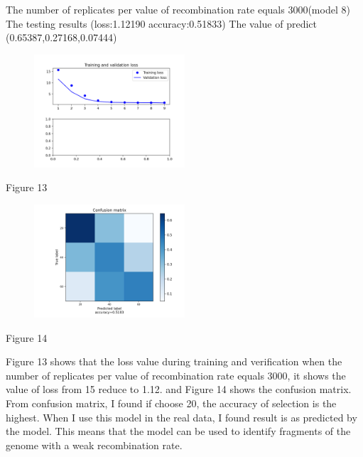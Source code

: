 \documentclass[11pt,a4 paper,title page]{article}
\begin{document}
The number of replicates per value of recombination rate equals 3000(model 8)
\hfill\break 
The testing results (loss:1.12190 accuracy:0.51833)
\hfill\break 
The value of predict (0.65387,0.27168,0.07444)
\begin{figure}[H]
\centering
\includegraphics[width=0.5\textwidth,angle=360]{../picture/figure13.png}
\end{figure}
\centerline{Figure 13}
\hfill\break 
\begin{figure}[H]
\centering
\includegraphics[width=0.5\textwidth,angle=360]{../picture/figure14.png}
\end{figure}
\centerline{Figure 14}
\hfill\break
Figure 13 shows that the loss value during training and verification when the number of replicates per value of recombination rate equals 3000, it shows the value of loss from 15 reduce to 1.12. and Figure 14 shows the confusion matrix. From confusion matrix, I found if choose 20, the accuracy of selection is the highest. When I use this model in the real data, I found result is as predicted by the model. This means that the model can be used to identify fragments of the genome with a weak recombination rate.
\hfill\break
\end{document}

